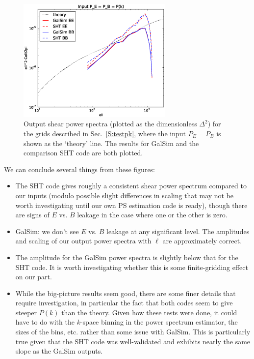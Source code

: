 \documentclass[preprint]{aastex}
\begin{document}
\begin{figure}
\begin{center}
\includegraphics[width=3in]{../external/test_gridshear/output/compare_input_peb.eps}
\caption{Output shear power spectra (plotted as the dimensionless
  $\Delta^2$) for the grids described in Sec.~\ref{S:testpk}, where
  the input $P_E=P_B$ is shown as the `theory' line. The results for GalSim and the
  comparison SHT code are both plotted.\label{F:peb}}
\end{center}
\end{figure}

We can conclude several things from these figures:
\begin{itemize}
\item The SHT code gives roughly a consistent shear power spectrum compared
  to our inputs (modulo possible slight differences in scaling that
  may not be worth investigating until our own PS estimation code is ready),
  though there are signs of $E$ vs. $B$ leakage in the case where one
  or the other is zero.
\item GalSim: we don't see $E$ vs. $B$ leakage at any significant
  level.  The amplitudes and scaling of our output power spectra with
  $\ell$ are approximately correct.
\item The amplitude for the GalSim power spectra is slightly below that
  for the SHT code.  It is worth investigating whether this is some
  finite-gridding effect on our part.
\item While the big-picture results seem good, there are some finer
  details that require investigation, in particular the fact that both
  codes seem to give steeper $P(k)$ than the theory.  Given how these
  tests were done, it could have to do with the $k$-space binning in
  the power spectrum estimator, the sizes of the bins, etc. rather
  than some issue with GalSim.
  This is particularly true given that the SHT code was well-validated
  and exhibits nearly the same slope as the GalSim outputs.
\end{itemize}
\end{document}
